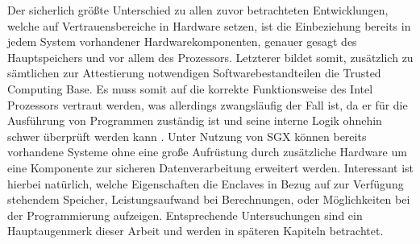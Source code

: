 Der sicherlich größte Unterschied zu allen zuvor betrachteten Entwicklungen, welche auf Vertrauensbereiche in Hardware setzen, ist die Einbeziehung bereits in jedem System vorhandener Hardwarekomponenten, genauer gesagt des Hauptspeichers und vor allem des Prozessors. Letzterer bildet somit, zusätzlich zu sämtlichen zur Attestierung notwendigen Softwarebestandteilen die Trusted Computing Base. Es muss somit auf die korrekte Funktionsweise des Intel Prozessors vertraut werden, was allerdings zwangsläufig der Fall ist, da er für die Ausführung von Programmen zuständig ist und seine interne Logik ohnehin schwer überprüft werden kann \cite{Aumasson2016}. Unter Nutzung von SGX können bereits vorhandene Systeme ohne eine große Aufrüstung durch zusätzliche Hardware um eine Komponente zur sicheren Datenverarbeitung erweitert werden. Interessant ist hierbei natürlich, welche Eigenschaften die Enclaves in Bezug auf zur Verfügung stehendem Speicher, Leistungsaufwand bei Berechnungen, oder Möglichkeiten bei der Programmierung aufzeigen. Entsprechende Untersuchungen sind ein Hauptaugenmerk dieser Arbeit und werden in späteren Kapiteln betrachtet.
